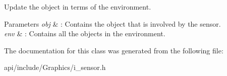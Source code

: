 Update the object in terms of the environment. 


\begin{DoxyParams}{Parameters}
{\em obj} & \+: Contains the object that is involved by the sensor. \\
\hline
{\em env} & \+: Contains all the objects in the environment. \\
\hline
\end{DoxyParams}


The documentation for this class was generated from the following file\+:\begin{DoxyCompactItemize}
\item 
api/include/\+Graphics/i\+\_\+sensor.\+h\end{DoxyCompactItemize}
